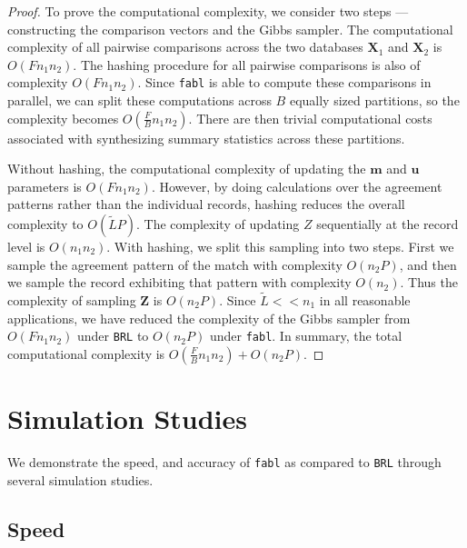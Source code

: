 \documentclass[ba]{imsart}
\begin{document}
\begin{proof}
To prove the computational complexity, we consider two steps --- constructing the comparison vectors and the Gibbs sampler. 
The computational complexity of all pairwise comparisons across the two databases $\bm{X}_1$ and $\bm{X}_2$ is $O(F n_1 n_2)$. The hashing procedure for all pairwise comparisons is also of complexity $O(F n_1 n_2)$. Since \texttt{fabl} is able to compute these comparisons in parallel, we can split these computations across $B$ equally sized partitions, so the complexity becomes $O(\frac{F}{B} n_1 n_2)$. There are then trivial computational costs associated with synthesizing summary statistics across these partitions. 

Without hashing, the computational complexity of updating the $\bm{m}$ and $\bm{u}$ parameters is $O(F n_1 n_2)$. However, by doing calculations over the agreement patterns rather than the individual records, hashing reduces the overall complexity to $O(\tilde{L}P)$. The complexity of updating $Z$ sequentially at the record level is $O(n_1 n_2)$. With hashing, we split this sampling into two steps. First we sample the agreement pattern of the match with complexity $O(n_2 P)$, and then we sample the record exhibiting that pattern with complexity $O(n_2)$. Thus the complexity of sampling $\bm{Z}$ is $O(n_2 P)$. Since $\tilde{L} << n_1$ in all reasonable applications, we have reduced the complexity of the Gibbs sampler from $O(F n_1 n_2)$ under \texttt{BRL} to $O(n_2 P)$ under \texttt{fabl}.
In summary, the total computational complexity is $O(\frac{F}{B} n_1 n_2) + O(n_2 P).$
\end{proof} 

\section{Simulation Studies}
\label{sec:simulations}

We demonstrate the speed, and accuracy of \texttt{fabl} as compared to \texttt{BRL} through several simulation studies. 

\hypertarget{speed}{%
	\subsection{Speed}\label{speed}}
\end{document}
